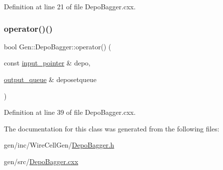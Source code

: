 Definition at line 21 of file Depo\+Bagger.\+cxx.

\mbox{\label{class_wire_cell_1_1_gen_1_1_depo_bagger_a1f79cacac114d24c939926147c6d9e2e}} 
\subsubsection{\texorpdfstring{operator()()}{operator()()}}
{\footnotesize\ttfamily bool Gen\+::\+Depo\+Bagger\+::operator() (\begin{DoxyParamCaption}\item[{const \hyperlink{class_wire_cell_1_1_i_queuedout_node_acf5f716a764553f3c7055a9cf67e906e}{input\+\_\+pointer} \&}]{depo,  }\item[{\hyperlink{class_wire_cell_1_1_i_queuedout_node_a39018e4e3dd886befac9636ac791a685}{output\+\_\+queue} \&}]{deposetqueue }\end{DoxyParamCaption})\hspace{0.3cm}{\ttfamily [virtual]}}



Definition at line 39 of file Depo\+Bagger.\+cxx.



The documentation for this class was generated from the following files\+:\begin{DoxyCompactItemize}
\item 
gen/inc/\+Wire\+Cell\+Gen/\hyperlink{_depo_bagger_8h}{Depo\+Bagger.\+h}\item 
gen/src/\hyperlink{_depo_bagger_8cxx}{Depo\+Bagger.\+cxx}\end{DoxyCompactItemize}
